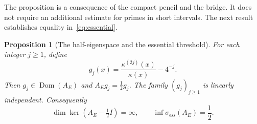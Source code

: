 \documentclass[11pt,a4paper]{article}
\numberwithin{equation}{section}
\newtheorem{proposition}[theorem]{Proposition}
\theoremstyle{remark}
\newcommand{\dom}{\operatorname{Dom}}
\newcommand{\ess}{\operatorname{ess}}
\begin{document}
The proposition is a consequence of the compact pencil and the bridge. It does not require an additional estimate for primes in short intervals. The next result establishes equality in~\eqref{eq:essential}.

\begin{proposition}[The half-eigenspace and the essential threshold]\label{prop:halfeigen}
For each integer $j\ge1$, define
\begin{equation}\label{eq:halfprofiles}
 g_j(x)=\frac{\kappa^{(2j)}(x)}{\kappa(x)}-4^{-j}.
\end{equation}
Then $g_j\in\dom(A_E)$ and $A_Eg_j=\tfrac12g_j$. The family $(g_j)_{j\ge1}$ is linearly independent. Consequently
\begin{equation}\label{eq:exactessential}
 \dim\ker(A_E-\tfrac12 I)=\infty,
 \qquad \inf\sigma_{\ess}(A_E)=\frac12.
\end{equation}
\end{proposition}
\end{document}
